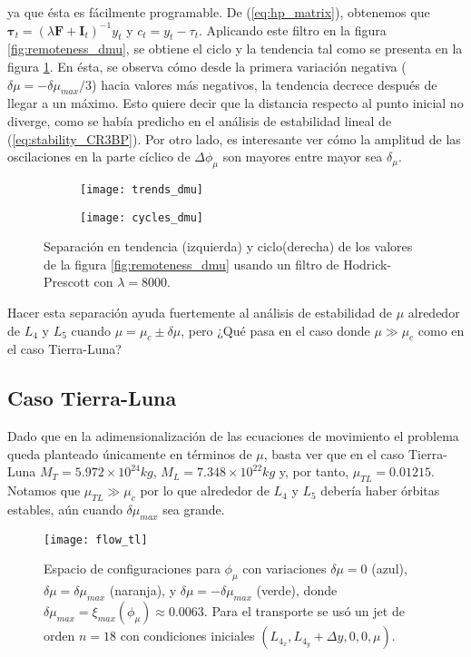 ya que ésta es fácilmente programable. De (\ref{eq:hp_matrix}), obtenemos que $\mathbf{\tau}_t = \left( \lambda \mathbf{F} + \mathbf{I}_t \right)^{-1} y_t$ y $c_t = y_t - \tau_t$. Aplicando este filtro en la figura \ref{fig:remoteness_dmu}, se obtiene el ciclo y la tendencia tal como se presenta en la figura \ref{fig:trendcycle_dmu}. En ésta, se observa cómo desde la primera variación negativa ($\delta\mu = -\delta\mu_{max}/3$) hacia valores más negativos, la tendencia decrece después de llegar a un máximo. Esto quiere decir que la distancia respecto al punto inicial no diverge, como se había predicho en el análisis de estabilidad lineal de (\ref{eq:stability_CR3BP}). Por otro lado, es interesante ver cómo la amplitud de las oscilaciones en la parte cíclico de $\Delta\phi_\mu$ son mayores entre mayor sea $\delta_\mu$.

\begin{figure}[h!]
\centering
\begin{subfigure}{0.49\textwidth}
	\centering
	\texttt{[image: trends\_dmu]}
\end{subfigure}
%
\begin{subfigure}{0.49\textwidth}
	\centering
	\texttt{[image: cycles\_dmu]}
\end{subfigure}
\caption{ Separación en tendencia (izquierda) y ciclo(derecha) de los valores de la figura \ref{fig:remoteness_dmu} usando un filtro de Hodrick-Prescott con $\lambda = 8000$.}
\label{fig:trendcycle_dmu}
\end{figure}

Hacer esta separación ayuda fuertemente al análisis de estabilidad de $\mu$ alrededor de $L_4$ y $L_5$ cuando $\mu = \mu_c \pm \delta\mu$, pero ¿Qué pasa en el caso donde $\mu \gg \mu_c$ como en el caso Tierra-Luna?

\subsection{Caso Tierra-Luna}
Dado que en la adimensionalización de las ecuaciones de movimiento el problema queda planteado únicamente en términos de $\mu$, basta ver que en el caso Tierra-Luna $M_T = 5.972 \times 10^{24} kg $, $M_L = 7.348 \times 10^{22} kg$ y, por tanto, $\mu_{TL} = 0.01215$. Notamos que $\mu_{TL} \gg \mu_c$ por lo que alrededor de $L_4$ y $L_5$ debería haber órbitas estables, aún cuando $\delta\mu_{max}$ sea grande.

\begin{figure}
 \centering
 \texttt{[image: flow\_tl]}
 \caption{Espacio de configuraciones para $\phi_\mu$ con variaciones $\delta\mu = 0$ (azul), $\delta\mu = \delta\mu_{max}$ (naranja), y $\delta\mu = -\delta\mu_{max}$ (verde), donde $\delta\mu_{max} = \xi_{max}(\phi_\mu) \approx 0.0063$. Para el transporte se usó un jet de orden $n=18$ con condiciones iniciales $\left( L_{4_x}, L_{4_y} + \Delta y, 0, 0, \mu \right)$.}
 \label{fig:flow_tl}
\end{figure}

